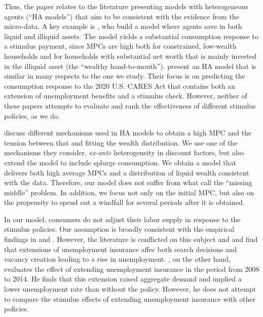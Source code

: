 \documentclass[\econtexRoot/HAFiscal]{subfiles}
\begin{document}
Thus, the paper relates to the literature presenting models with heterogeneous agents (``HA models'') that aim to be consistent with the evidence from the micro-data. A key example is \cite{kaplan2014model}, who build a model where agents save in both liquid and illiquid assets. The model yields a substantial consumption response to a stimulus payment, since MPCs are high both for constrained, low-wealth households and for households with substantial net worth that is mainly invested in the illiquid asset (the ``wealthy hand-to-mouth''). \cite{carroll2020modeling} present an HA model that is similar in many respects to the one we study. Their focus is on predicting the consumption response to the 2020 U.S. CARES Act that contains both an extension of unemployment benefits and a stimulus check. However, neither of these papers attempts to evaluate and rank the effectiveness of different stimulus policies, as we do.

\cite{kaplanMPC2022} discuss different mechanisms used in HA models to obtain a high MPC and the tension between that and fitting the wealth distribution. We use one of the mechanisms they consider, \textit{ex-ante} heterogeneity in discount factors, but also extend the model to include splurge consumption. We obtain a model that delivers both high average MPCs and a distribution of liquid wealth consistent with the data. Therefore, our model does not suffer from what \cite{kaplanMPC2022} call the ``missing middle'' problem. In addition, we focus not only on the initial MPC, but also on the propensity to spend out a windfall for several periods after it is obtained. 

In our model, consumers do not adjust their labor supply in response to the stimulus policies.  Our assumption is broadly consistent with the empirical findings in \cite{ganong2022spending} and \cite{chodorow2016limited}. However, the literature is conflicted on this subject and \cite{hagedorn2017impact} and \cite{hagedorn2019unemployment} find that extensions of unemployment insurance affec both search decisions and vacancy creation leading to a rise in unemployment. \cite{kekre2022unemployment}, on the other hand, evaluates the effect of extending unemployment insurance in the period from 2008 to 2014. He finds that this extension raised aggregate demand and implied a lower unemployment rate than without the policy. However, he does not attempt to compare the stimulus effects of extending unemployment insurance with other policies.
\end{document}
